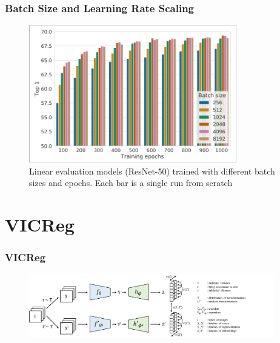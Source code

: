 \documentclass[13pt,aspectratio=169]{beamer}
\begin{document}
\begin{frame}
  \frametitle{Batch Size and Learning Rate Scaling}
  \begin{figure}
  	\begin{center}
  		\includegraphics[height=6cm]{imgs/batch_size_simclr.png}
  	\end{center}
	\caption{Linear evaluation models (ResNet-50)
	trained with different batch sizes and epochs. Each
	bar is a single run from scratch}
  \end{figure}
  
\end{frame}

\section{VICReg}
\begin{frame}
  \frametitle{VICReg}
  \begin{figure}
  	\begin{center}
  		\includegraphics[width=0.95\textwidth]{imgs/vicreg_architecture.pdf}
  	\end{center}
  \end{figure}
  
\end{frame}
\end{document}
